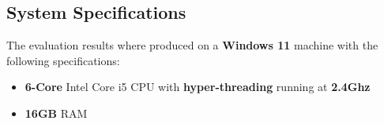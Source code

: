 \documentclass[12pt]{article}
\begin{document}
\subsection{System Specifications}
The evaluation results where produced on a \textbf{Windows 11} machine with the following specifications:
\begin{itemize}
    \item \textbf{6-Core} Intel Core i5 CPU with \textbf{hyper-threading} running at \textbf{2.4Ghz}
    \item \textbf{16GB} RAM
\end{itemize}
\end{document}
